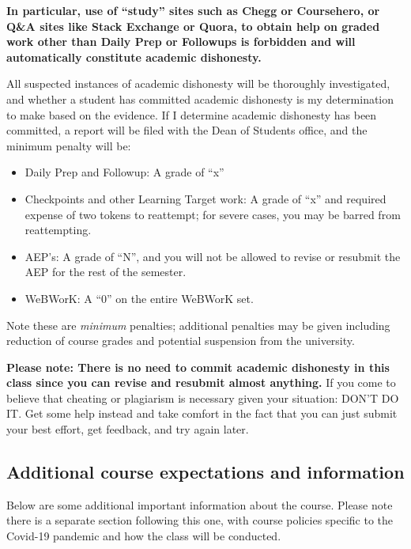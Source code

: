 \documentclass[]{article}
\providecommand{\tightlist}{%
  \setlength{\itemsep}{0pt}\setlength{\parskip}{0pt}}
\begin{document}
\textbf{In particular, use of ``study'' sites such as Chegg or
Coursehero, or Q\&A sites like Stack Exchange or Quora, to obtain help
on graded work other than Daily Prep or Followups is forbidden and will
automatically constitute academic dishonesty.}

All suspected instances of academic dishonesty will be thoroughly
investigated, and whether a student has committed academic dishonesty is
my determination to make based on the evidence. If I determine academic
dishonesty has been committed, a report will be filed with the Dean of
Students office, and the minimum penalty will be:

\begin{itemize}
\tightlist
\item
  Daily Prep and Followup: A grade of ``x''
\item
  Checkpoints and other Learning Target work: A grade of ``x'' and
  required expense of two tokens to reattempt; for severe cases, you may
  be barred from reattempting.
\item
  AEP's: A grade of ``N'', and you will not be allowed to revise or
  resubmit the AEP for the rest of the semester.
\item
  WeBWorK: A ``0'' on the entire WeBWorK set.
\end{itemize}

Note these are \emph{minimum} penalties; additional penalties may be
given including reduction of course grades and potential suspension from
the university.

\textbf{Please note: There is no need to commit academic dishonesty in
this class since you can revise and resubmit almost anything.} If you
come to believe that cheating or plagiarism is necessary given your
situation: DON'T DO IT. Get some help instead and take comfort in the
fact that you can just submit your best effort, get feedback, and try
again later.

\hypertarget{additional-course-expectations-and-information}{%
\subsection{Additional course expectations and
information}\label{additional-course-expectations-and-information}}

Below are some additional important information about the course. Please
note there is a separate section following this one, with course
policies specific to the Covid-19 pandemic and how the class will be
conducted.
\end{document}
